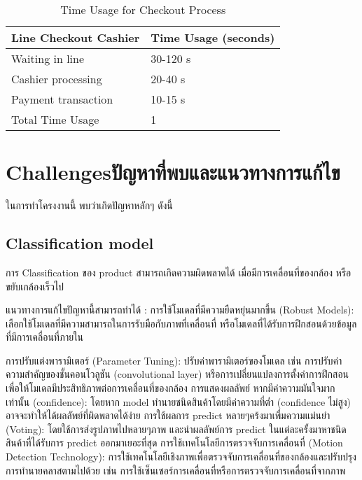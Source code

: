 \begin{table}[htbp]
    \centering
    \caption{Time Usage for Checkout Process}
    \begin{tabular}{|p{5cm}|p{2cm}|}
        \textbf{Line Checkout Cashier} & \textbf{Time Usage (seconds)} \\
        \hline
        Waiting in line                & 30-120 s                      \\
        Cashier processing             & 20-40 s                       \\
        Payment transaction            & 10-15 s                       \\
        \hline
        Total Time Usage               & 1                             \\
        \hline
    \end{tabular}
\end{table}
 
\section{\ifenglish Challenges\else ปัญหาที่พบและแนวทางการแก้ไข\fi}
ในการทำโครงงานนี้ พบว่าเกิดปัญหาหลักๆ ดังนี้
\subsection{Classification model}
 

การ Classification ของ product สามารถเกิดความผิดพลาดได้ เมื่อมีการเคลื่อนที่ของกล้อง หรือขยับเกล้องเร็วไป

แนวทางการแก้ไขปัญหานี้สามารถทำได้ :
การใช้โมเดลที่มีความยืดหยุ่นมากขึ้น (Robust Models): เลือกใช้โมเดลที่มีความสามารถในการรับมือกับภาพที่เคลื่อนที่ หรือโมเดลที่ได้รับการฝึกสอนด้วยข้อมูลที่มีการเคลื่อนที่ภายใน

การปรับแต่งพารามิเตอร์ (Parameter Tuning): ปรับค่าพารามิเตอร์ของโมเดล เช่น การปรับค่าความสำคัญของชั้นคอนโวลูชัน (convolutional layer) หรือการเปลี่ยนแปลงการตั้งค่าการฝึกสอนเพื่อให้โมเดลมีประสิทธิภาพต่อการเคลื่อนที่ของกล้อง
การแสดงผลลัพย์ หากมีค่าความมันใจมากเท่านั้น  (confidence): โดยหาก model ทำนายชนิดสินค้าโดยมีค่าความที่ต่ำ (confidence ไม่สูง) อาจจะทำให้ได้ผลลัพย์ที่ผิดพลาดได้ง่าย
การใช้ผลการ predict หลายๆคร้งมาเพื่มความแม่นยำ (Voting): โดยใช้การส่งรูปภาพไปหลายๆภาพ และนำผลลัพย์การ predict ในแต่ละครั้งมาหาชนิดสินค้าที่ได้รับการ predict ออกมาเยอะที่สุด
การใช้เทคโนโลยีการตรวจจับการเคลื่อนที่ (Motion Detection Technology): การใช้เทคโนโลยีเชิงภาพเพื่อตรวจจับการเคลื่อนที่ของกล้องและปรับปรุงการทำนายคลาสตามไปด้วย เช่น การใช้เซ็นเซอร์การเคลื่อนที่หรือการตรวจจับการเคลื่อนที่จากภาพ
 
